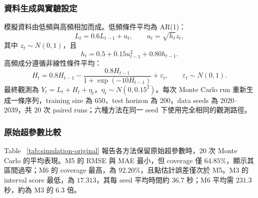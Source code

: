 {\subsubsection*{資料生成與實驗設定}

模擬資料由低頻與高頻相加而成。低頻條件平均為 AR(1)：
\[
    L_t=0.6L_{t-1}+u_t,
    \qquad
    u_t=\sqrt{h_t}z_t,
\]
其中 $z_t\sim N(0,1)$，且
\[
    h_t=0.5+0.15u_{t-1}^{2}+0.80h_{t-1}.
\]
高頻成分遵循非線性條件平均：
\[
    H_t=0.8H_{t-1}
    -\frac{0.8H_{t-1}}{1+\exp(-10H_{t-1})}
    +\varepsilon_t,
    \qquad \varepsilon_t\sim N(0,1).
\]
最終觀測為 $Y_t=L_t+H_t+\eta_t$，$\eta_t\sim N(0,0.15^2)$。每次 Monte Carlo run 重新生成一條序列，training size 為 $650$、test horizon 為 $200$，data seeds 為 2020--2039，共 $20$ 次 paired runs；六種方法在同一 seed 下使用完全相同的觀測路徑。

\subsubsection*{原始超參數比較}

Table ~\ref{tab:simulation-original} 報告各方法保留原始超參數時，$20$ 次 Monte Carlo 的平均表現。M5 的 RMSE 與 MAE 最小，但 coverage 僅 $64.85\%$，顯示其區間過窄；M6 的 coverage 最高，為 $92.20\%$，且點估計誤差僅次於 M5。M3 的 interval score 最低，為 $17.313$，其每 seed 平均時間約 $36.7$ 秒；M6 平均需 $231.3$ 秒，約為 M3 的 $6.3$ 倍。

\begin{table}[htbp]
\centering
\caption{M1M9--GARCH 模擬資料：原始超參數之 20 次 Monte Carlo 平均結果}
\label{tab:simulation-original}
\end{table}

}
